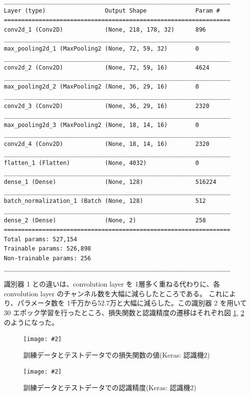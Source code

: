 \documentclass[a4paper,dvipdfmx]{jsarticle}
\newcommand{\image}[3]{
    \begin{figure}[H]
        \begin{center}
        \texttt{[image: \#2]}
        \end{center}
        \caption{#1}
        \label{#3}
    \end{figure}
}
\begin{document}
\begin{lstlisting}[caption="識別器 2 ",label=B2-2]
_________________________________________________________________
Layer (type)                 Output Shape              Param #
=================================================================
conv2d_1 (Conv2D)            (None, 218, 178, 32)      896
_________________________________________________________________
max_pooling2d_1 (MaxPooling2 (None, 72, 59, 32)        0
_________________________________________________________________
conv2d_2 (Conv2D)            (None, 72, 59, 16)        4624
_________________________________________________________________
max_pooling2d_2 (MaxPooling2 (None, 36, 29, 16)        0
_________________________________________________________________
conv2d_3 (Conv2D)            (None, 36, 29, 16)        2320
_________________________________________________________________
max_pooling2d_3 (MaxPooling2 (None, 18, 14, 16)        0
_________________________________________________________________
conv2d_4 (Conv2D)            (None, 18, 14, 16)        2320
_________________________________________________________________
flatten_1 (Flatten)          (None, 4032)              0
_________________________________________________________________
dense_1 (Dense)              (None, 128)               516224
_________________________________________________________________
batch_normalization_1 (Batch (None, 128)               512
_________________________________________________________________
dense_2 (Dense)              (None, 2)                 258
=================================================================
Total params: 527,154
Trainable params: 526,898
Non-trainable params: 256
_________________________________________________________________
\end{lstlisting}

識別器 1 との違いは、convolution layer を 1層多く重ねる代わりに、各 convolution layer のチャンネル数を大幅に減らしたところである。
これにより、パラメータ数を 1千万から52.7万と大幅に減らした。この識別器 2 を用いて 30 エポック学習を行ったところ、損失関数と認識精度の遷移はそれぞれ図 \ref{fig-B2-3}, \ref{fig-B2-4} のようになった。

\image{訓練データとテストデータでの損失関数の値(Keras: 認識機2)}{report_b2-3.png}{fig-B2-3}
\image{訓練データとテストデータでの認識精度(Keras: 認識機2)}{report_b2-4.png}{fig-B2-4}
\end{document}
